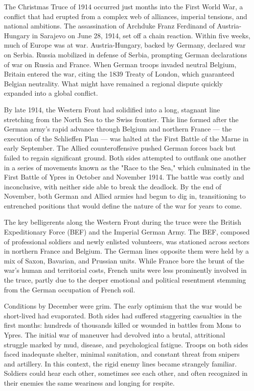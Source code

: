 \begin{historical}
The Christmas Truce of 1914 occurred just months into the First World War, a conflict that had erupted from a complex web of alliances, imperial tensions, and national ambitions. The assassination of Archduke Franz Ferdinand of Austria-Hungary in Sarajevo on June 28, 1914, set off a chain reaction. Within five weeks, much of Europe was at war. Austria-Hungary, backed by Germany, declared war on Serbia. Russia mobilized in defense of Serbia, prompting German declarations of war on Russia and France. When German troops invaded neutral Belgium, Britain entered the war, citing the 1839 Treaty of London, which guaranteed Belgian neutrality. What might have remained a regional dispute quickly expanded into a global conflict.

By late 1914, the Western Front had solidified into a long, stagnant line stretching from the North Sea to the Swiss frontier. This line formed after the German army’s rapid advance through Belgium and northern France — the execution of the Schlieffen Plan — was halted at the First Battle of the Marne in early September. The Allied counteroffensive pushed German forces back but failed to regain significant ground. Both sides attempted to outflank one another in a series of movements known as the "Race to the Sea," which culminated in the First Battle of Ypres in October and November 1914. The battle was costly and inconclusive, with neither side able to break the deadlock. By the end of November, both German and Allied armies had begun to dig in, transitioning to entrenched positions that would define the nature of the war for years to come.

The key belligerents along the Western Front during the truce were the British Expeditionary Force (BEF) and the Imperial German Army. The BEF, composed of professional soldiers and newly enlisted volunteers, was stationed across sectors in northern France and Belgium. The German lines opposite them were held by a mix of Saxon, Bavarian, and Prussian units. While France bore the brunt of the war’s human and territorial costs, French units were less prominently involved in the truce, partly due to the deeper emotional and political resentment stemming from the German occupation of French soil.

Conditions by December were grim. The early optimism that the war would be short-lived had evaporated. Both sides had suffered staggering casualties in the first months: hundreds of thousands killed or wounded in battles from Mons to Ypres. The initial war of maneuver had devolved into a brutal, attritional struggle marked by mud, disease, and psychological fatigue. Troops on both sides faced inadequate shelter, minimal sanitation, and constant threat from snipers and artillery. In this context, the rigid enemy lines became strangely familiar. Soldiers could hear each other, sometimes see each other, and often recognized in their enemies the same weariness and longing for respite.

\end{historical}